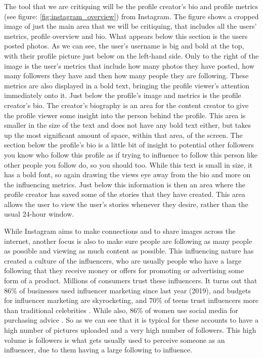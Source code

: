 \documentclass{sigchi}
\begin{document}
	The tool that we are critiquing will be the profile creator's bio and profile metrics (see figure: \ref{fig:instagram_overview}) from Instagram. The figure shows a cropped image of just the main area that we will be critiquing, that includes all the users' metrics, profile overview and bio. What appears below this section is the users posted photos. As we can see, the user's username is big and bold at the top, with their profile picture just below on the left-hand side. Only to the right of the image is the user's metrics that include how many photos they have posted, how many followers they have and then how many people they are following. These metrics are also displayed in a bold text, bringing the profile viewer's attention immediately onto it. Just below the profile's image and metrics is the profile creator's bio. The creator's biography is an area for the content creator to give the profile viewer some insight into the person behind the profile. This area is smaller in the size of the text and does not have any bold text either, but takes up the most significant amount of space, within that area, of the screen. The section below the profile's bio is a little bit of insight to potential other followers you know who follow this profile as if trying to influence to follow this person like other people you follow do, so you should too. While this text is small in size, it has a bold font, so again drawing the views eye away from the bio and more on the influencing metrics. Just below this information is then an area where the profile creator has saved some of the stories that they have created. This area allows the user to view the user's stories whenever they desire, rather than the usual 24-hour window.
	
	While Instagram aims to make connections and to share images across the internet, another focus is also to make sure people are following as many people as possible and viewing as much content as possible. This influencing nature has created a culture of the influencers, who are usually people who have a large following that they receive money or offers for promoting or advertising some form of a product. Millions of consumers trust these influencers. It turns out that 86\% of businesses used influencer marketing since last year (2019), and budgets for influencer marketing are skyrocketing, and 70\% of teens trust influencers more than traditional celebrities \cite{influencers}.  While also, 86\% of women use social media for purchasing advice \cite{influencers}. So as we can see that it is typical for these accounts to have a high number of pictures uploaded and a very high number of followers. This high volume is followers is what gets usually used to perceive someone as an influencer, due to them having a large following to influence.
	
\end{document}
